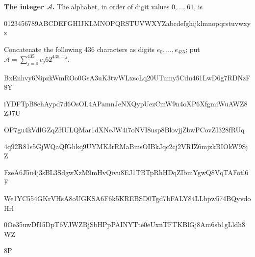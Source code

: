 \textbf{The integer $\mathcal A$.}
The alphabet, in order of digit values $0,\ldots,61$, is
\begin{center}
{\small\ttfamily 0123456789ABCDEFGHIJKLMNOPQRSTUVWXYZabcdefghijklmnopqrstuvwxyz}
\end{center}
Concatenate the following 436 characters as digits $e_0,\ldots,e_{435}$;
put $\mathcal A=\sum_{j=0}^{435}e_j62^{435-j}$.\par
\begingroup\small\ttfamily
BxEnhvy6NipzkWmROo0GsA3uK3twWLxscLq20UTumy5Cdu461LwD6g7RDNzF8Y\par
iYDFTpB8ehAypd7d6OsOL4APamnJeNXQypUezCmW9n4oXP6XfgmiWuAWZ8ZJ7U\par
OP7gu4kVdlGZqZHULQMar1dXNeJW4i7oNVI8usp8BlovjjZbwPCovZI328fRUq\par
4q92R81s5GjWQaQfGhkq9UYMK3rRMaBmsOIBkJqc2cj2VRIZ6mjzkBIOkW9SjZ\par
FzeA6J5u4j3sBL3SdgwXzM9mHvQivu8EJ1TBTpRhHDqZIbmYgwQ8VqTAFotl6F\par
We1YC554GKrVHsA8oUGKSA6F6k5KREBSD0Tgd7bFALY84LLbpw574BQyvdoHrl\par
0Oe35uwDf15DpT6VJWZBjSbHPpPAINYTte0eUxnTFTKBlGj8Am6sb1gLldh8WZ\par
8P\par
\endgroup

\endgroup

